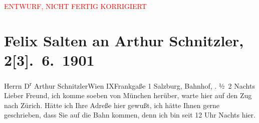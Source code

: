 
\begin{center}
            \textcolor{red}{ENTWURF, NICHT FERTIG KORRIGIERT}
                      \end{center}
            
         
         \renewcommand{\erwaehntePersonen}{Personen: Richard Beer-Hofmann, Leo Van-Jung}
         \renewcommand{\erwaehnteOrte}{Orte: Frankgasse, Hauptbahnhof Salzburg, Hotel Castiglione, IX., Alsergrund, München, Wien, Zürich}
         \renewcommand{\erwaehnteWerke}{Werke: Olga Frohgemuth. Erzählung}
               \section[Felix Salten an Arthur Schnitzler, 2{[}3{]}. 6. 1901]{ Felix Salten an Arthur Schnitzler, 2{[}3{]}. 6. 1901}\nopagebreak{}\rehead{ }\begin{ledgroupsized}[t]{13cm}\normalsize\beginnumbering \toendnotes[C]{\smallbreak\pagebreak[2]} 
\toendnotes[C]{\smallbreak}\pstart{}{\pb}Herrn D\textsuperscript{r} Arthur Schnitzler\pend{}\pstart{}Wien IX\pend{}\pstart{}Frankgaße 1\pend{}{\bigskip}\pstart
           \raggedleft{}{\pb}Salzburg, Bahnhof, \label{K_L03314-1v}\label{K_L03314-1h}. \pend
           \pstart
           \raggedleft{}½ 2 Nachts\pend
           \pstart
           Lieber Freund, ich komme soeben von München herüber, warte hier auf den Zug nach Zürich. Hätte ich Ihre Adreße hier gewußt, ich hätte Ihnen gerne
               geschrieben, dass Sie auf die Bahn kommen, denn ich bin seit 12 Uhr Nachts hier.

\end{ledgroupsized}
